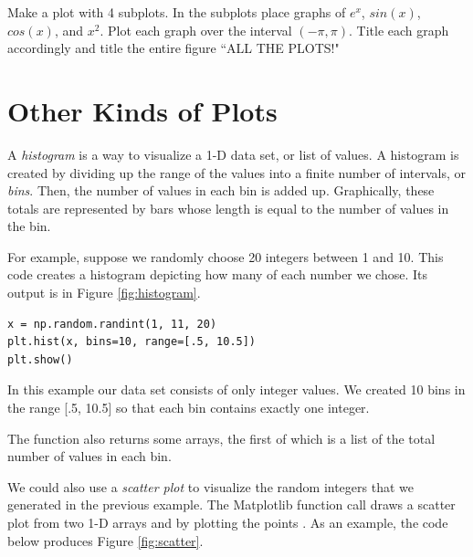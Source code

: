 \begin{problem} %
Make a plot with 4 subplots.
In the subplots place graphs of $e^x$, $sin(x)$, $cos(x)$, and $x^2$.
Plot each graph over the interval $(-\pi,\pi)$.
Title each graph accordingly and title the entire figure ``ALL THE PLOTS!"
\end{problem}

\section*{Other Kinds of Plots} %


A \emph{histogram} is a way to visualize a 1-D data set, or list of values. 
A histogram is created by dividing up the range of the values into a finite number of intervals, or \emph{bins}.
Then, the number of values in each bin is added up.
Graphically, these totals are represented by bars whose length is equal to the number of values in the bin.

For example, suppose we randomly choose 20 integers between 1 and 10.
This code creates a histogram depicting how many of each number we chose.
Its output is in Figure \ref{fig:histogram}.

\begin{lstlisting}
x = np.random.randint(1, 11, 20)
plt.hist(x, bins=10, range=[.5, 10.5])
plt.show()
\end{lstlisting}

In this example our data set  consists of only integer values.
We created 10 bins in the range [.5, 10.5] so that each bin contains exactly one integer.

The function  also returns some arrays, the first of which is a list of the total number of values in each bin.

We could also use a \emph{scatter plot} to visualize the random integers  that we generated in the previous example. 
The Matplotlib function call  draws a scatter plot from two 1-D arrays  and  by plotting the points .
As an example, the code below produces Figure \ref{fig:scatter}.

